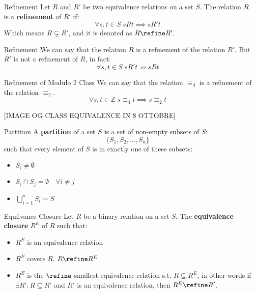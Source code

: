 \begin{definition}{Refinement}
    Let $R$ and $R'$ be two equivalence relations on a set $S$.
    The relation $R$ is a \textbf{refinement} of $R'$ if:
    \begin{equation*}
        \forall s,t \in S \; sRt \implies sR't
    \end{equation*}
    Which means $R \subsetneq R'$, and it is denoted as $R \refine R'$.  
\end{definition}

\begin{remark}{Refinement}
    We can say that the relation $R$ is a refinement of the relation $R'$.
    But $R'$ is not a refinement of $R$, in fact:
    \begin{equation*}
        \forall s,t \in S \; sR't \nRightarrow  sRt
    \end{equation*}
\end{remark}

\begin{example}{Refinement of Modulo 2 Class}
    We can say that the relation $\equiv_4$ is a refinement of the relation $\equiv_2$.
    \begin{equation*}
        \forall s,t \in \mathbb{Z} \; s \equiv_4 t \implies s \equiv_2 t
    \end{equation*}
\end{example}

[IMAGE OG CLASS EQUIVALENCE IN 8 OTTOBRE]

\begin{definition}{Partition}
    A \textbf{partition} of a set $S$ is a set of non-empty subsets of $S$:
    \begin{equation*}
        \{ S_1, S_2, \dots, S_n \}
    \end{equation*} 
    such that every element of $S$ is in exactly one of these subsets:
    \begin{itemize}
        \item $S_i \neq \emptyset$
        \item $S_i \cap S_j = \emptyset \quad \forall i \neq j$
        \item $\bigcup_{i=1}^{n} S_i = S$
    \end{itemize}
\end{definition}

\begin{definition}{Equilvance Closure}
    Let $R$ be a binary relation on a set $S$.
    The \textbf{equivalence closure} $R^E$ of $R$ such that:   
    \begin{itemize}
        \item $R^E$ is an equivalence relation
        \item $R^E$ covers $R$, $R \refine R^E$
        \item $R^E$ is the $\refine$-smallest equivalence relation 
        s.t. $R \subseteq R^E$, in other words
        if $\exists R': R \subseteq R'$ and $R'$ is an equivalence relation, 
        then $R^E \refine R'$.    
    \end{itemize}
\end{definition}


